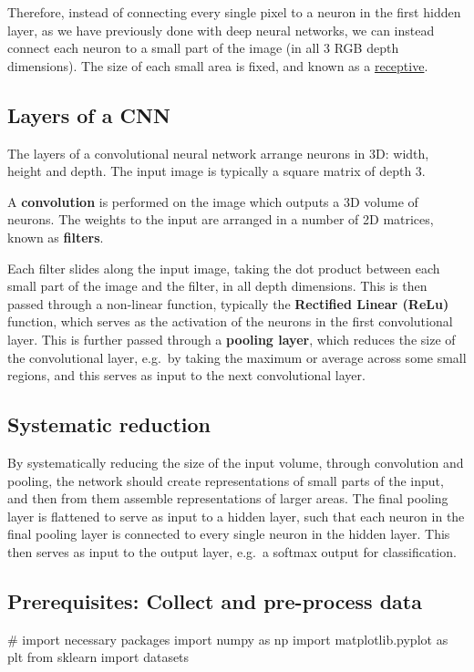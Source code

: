 \documentclass[%
oneside,                 %
final,                   %
10pt]{article}
\begin{document}
Therefore, instead of connecting every single pixel to a neuron in the
first hidden layer, as we have previously done with deep neural
networks, we can instead connect each neuron to a small part of the
image (in all 3 RGB depth dimensions).  The size of each small area is
fixed, and known as a \href{{https://en.wikipedia.org/wiki/Receptive_field}}{receptive}.


\subsection{Layers of a CNN}
The layers of a convolutional neural network arrange neurons in 3D: width, height and depth.  
The input image is typically a square matrix of depth 3. 

A \textbf{convolution} is performed on the image which outputs
a 3D volume of neurons. The weights to the input are arranged in a number of 2D matrices, known as \textbf{filters}.


Each filter slides along the input image, taking the dot product
between each small part of the image and the filter, in all depth
dimensions. This is then passed through a non-linear function,
typically the \textbf{Rectified Linear (ReLu)} function, which serves as the
activation of the neurons in the first convolutional layer. This is
further passed through a \textbf{pooling layer}, which reduces the size of the
convolutional layer, e.g.~by taking the maximum or average across some
small regions, and this serves as input to the next convolutional
layer.


\subsection{Systematic reduction}

By systematically reducing the size of the input volume, through
convolution and pooling, the network should create representations of
small parts of the input, and then from them assemble representations
of larger areas.  The final pooling layer is flattened to serve as
input to a hidden layer, such that each neuron in the final pooling
layer is connected to every single neuron in the hidden layer. This
then serves as input to the output layer, e.g.~a softmax output for
classification.


\subsection{Prerequisites: Collect and pre-process data}
\bpycod
# import necessary packages
import numpy as np
import matplotlib.pyplot as plt
from sklearn import datasets
\end{document}
